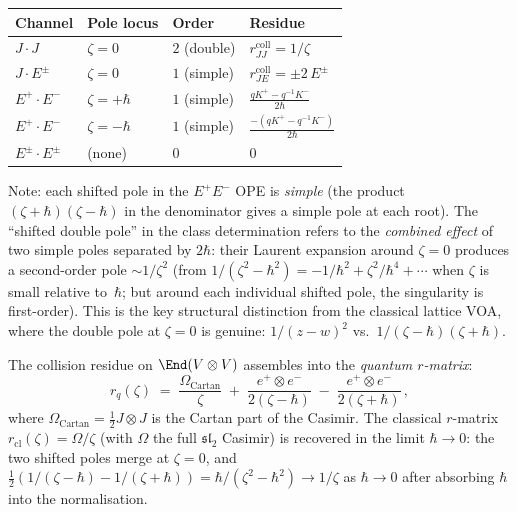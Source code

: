 \begin{conjecture}
\begin{center}
\small
\renewcommand{\arraystretch}{1.3}
\begin{tabular}{llll}
\toprule
\textbf{Channel} & \textbf{Pole locus} & \textbf{Order}
 & \textbf{Residue} \\
\midrule
$J \cdot J$ & $\zeta = 0$ & $2$ (double)
 & $r_{JJ}^{\mathrm{coll}} = 1/\zeta$ \\
$J \cdot E^\pm$ & $\zeta = 0$ & $1$ (simple)
 & $r_{JE}^{\mathrm{coll}} = \pm 2\,E^\pm$ \\
$E^+ \cdot E^-$ & $\zeta = +\hbar$ & $1$ (simple)
 & $\displaystyle\frac{qK^+ - q^{-1}K^-}{2\hbar}$ \\
$E^+ \cdot E^-$ & $\zeta = -\hbar$ & $1$ (simple)
 & $\displaystyle\frac{-(qK^+ - q^{-1}K^-)}{2\hbar}$ \\
$E^\pm \cdot E^\pm$ & (none) & $0$
 & $0$ \\
\bottomrule
\end{tabular}
\end{center}
\noindent
Note: each shifted pole in the $E^+E^-$ OPE is
\emph{simple} (the product $(\zeta+\hbar)(\zeta-\hbar)$
in the denominator gives a simple pole at each root).
The ``shifted double pole'' in the class
determination refers to the \emph{combined effect} of
two simple poles separated by $2\hbar$: their Laurent
expansion around $\zeta = 0$ produces a second-order
pole $\sim 1/\zeta^2$ (from $1/(\zeta^2 - \hbar^2)
= -1/\hbar^2 + \zeta^2/\hbar^4 + \cdots$ when $\zeta$
is small relative to~$\hbar$; but around each
individual shifted pole, the singularity is first-order).
This is the key structural distinction from the classical
lattice VOA, where the double pole at $\zeta = 0$ is
genuine: $1/(z-w)^2$ vs.\
$1/(\zeta - \hbar)(\zeta + \hbar)$.

The collision residue on $\End(V \otimes V)$ assembles into
the \emph{quantum $r$-matrix}:
\begin{equation}\label{eq:qlattice-quantum-r}
r_q(\zeta)
\;=\;
\frac{\Omega_{\mathrm{Cartan}}}{\zeta}
\;+\;
\frac{e^+ \otimes e^-}{2(\zeta - \hbar)}
\;-\;
\frac{e^+ \otimes e^-}{2(\zeta + \hbar)}\,,
\end{equation}
where $\Omega_{\mathrm{Cartan}} = \tfrac{1}{2}J \otimes J$
is the Cartan part of the Casimir. The classical
$r$-matrix $r_{\mathrm{cl}}(\zeta) = \Omega/\zeta$
(with $\Omega$ the full $\mathfrak{sl}_2$ Casimir) is
recovered in the limit $\hbar \to 0$: the two shifted poles
merge at $\zeta = 0$, and
$\tfrac{1}{2}(1/(\zeta - \hbar) - 1/(\zeta + \hbar))
= \hbar/(\zeta^2 - \hbar^2) \to 1/\zeta$ as $\hbar \to 0$
after absorbing $\hbar$ into the normalisation.


\end{conjecture}
